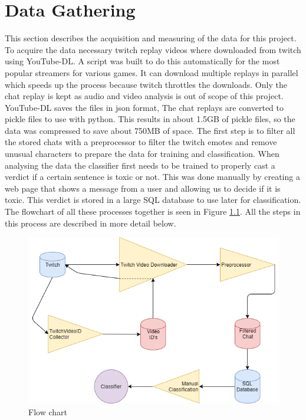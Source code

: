 \documentclass[final]{report}
\begin{document}
\chapter{Data Gathering}
\label{ch:datagathering}

This section describes the acquisition and measuring of the data for this project.
To acquire the data necessary twitch replay videos where downloaded from twitch using YouTube-DL.
A script was built to do this automatically for the most popular streamers for various games. 
It can download multiple replays in parallel which speeds up the process because twitch throttles the downloads.
Only the chat replay is kept as audio and video analysis is out of scope of this project.
YouTube-DL saves the files in json format,  The chat replays are converted to pickle files to use with python. 
This results in about 1.5GB of pickle files, so the data was compressed to save about 750MB of space.
The first step is to filter all the stored chats with a preprocessor to filter the twitch emotes and remove unusual characters to prepare the data for training and classification.
When analysing the data the classifier first needs to be trained to properly cast a verdict if a certain sentence is toxic or not.
This was done manually by creating a web page that shows a message from a user and allowing us to decide if it is toxic. This verdict is stored in a large SQL database to use later for classification. 
The flowchart of all these processes together is seen in Figure \ref{fig:flowchart}. All the steps in this process are described in more detail below.


\begin{figure}[h]
	\includegraphics[width=\textwidth]{FlowChart.png}
	\caption{Flow chart}
	\label{fig:flowchart}
\end{figure}
\end{document}
